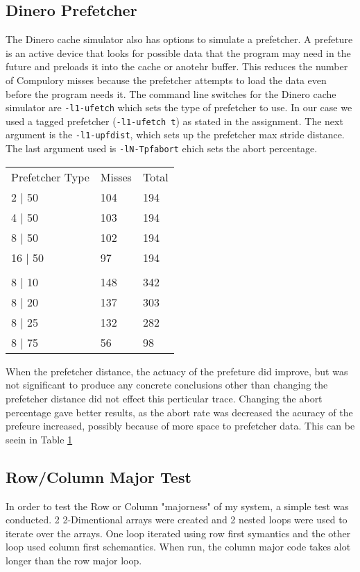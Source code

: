 \documentclass{article}
\begin{document}
	\subsection{Dinero Prefetcher}
		The Dinero cache simulator also has options to simulate a prefetcher. A prefeture is an active device that looks for possible data that the program may need in the future and preloads it into the cache or anotehr buffer. This reduces the number of Compulory misses because the prefetcher attempts to load the data even before the program needs it. The command line switches for the Dinero cache simulator are \verb|-l1-ufetch| which sets the type of prefetcher to use. In our case we used a tagged prefetcher (\verb|-l1-ufetch t|) as stated in the assignment. The next argument is the \verb|-l1-upfdist|, which sets up the prefetcher max stride distance. The last argument used is \verb|-lN-Tpfabort| ehich sets the abort percentage. 

		\begin{table}[]
			\label{din:prefetch_data}
			\begin{tabular}{lll}
			Prefetcher Type & Misses & Total \\
			2 | 50          & 104    & 194   \\
			4 | 50          & 103    & 194   \\
			8 | 50          & 102    & 194   \\
			16 | 50         & 97     & 194   \\
			& & \\
			8 | 10          & 148    & 342   \\
			8 | 20          & 137    & 303   \\
			8 | 25          & 132    & 282   \\
			8 | 75          & 56     & 98   
			\end{tabular}
		\end{table}

		When the prefetcher distance, the actuacy of the prefeture did improve, but was not significant to produce any concrete conclusions other than changing the prefetcher distance did not effect this perticular trace. Changing the abort percentage gave better results, as the abort rate was decreased the acuracy of the prefeure increased, possibly because of more space to prefetcher data. This can be seein in Table \ref{din:prefetch_data}

	\subsection{Row/Column Major Test}
		In order to test the Row or Column "majorness" of my system, a simple test was conducted. 2 2-Dimentional arrays were created and 2 nested loops were used to iterate over the arrays. One loop iterated using row first symantics and the other loop used column first schemantics. When run, the column major code takes alot longer than the row major loop.
\end{document}
